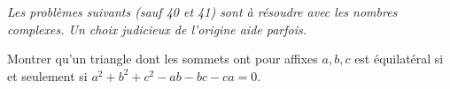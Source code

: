 \emph{Les problèmes suivants (sauf 40 et 41) sont à résoudre avec les nombres complexes. Un choix judicieux de l'origine aide parfois.}

Montrer qu'un triangle dont les sommets ont pour affixes $a, b, c$ est équilatéral si et seulement si $a^2 + b^2 + c^2 - ab - bc - ca = 0$.
